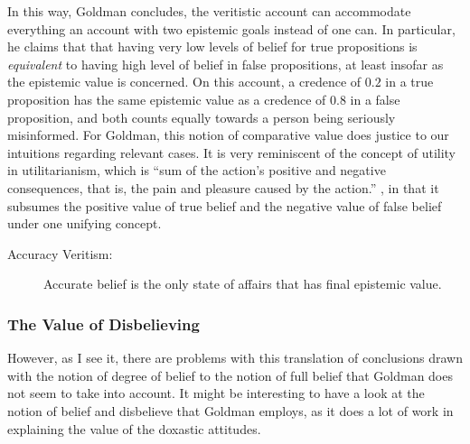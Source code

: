 \documentclass[12pt,numbers=noenddot]{scrartcl}
\begin{document}
In this way, Goldman concludes, the veritistic account can accommodate everything an account with two epistemic goals instead of one can. In particular, he claims that that having very low levels of belief for true propositions is \emph{equivalent} to having high level of belief in false propositions, at least insofar as the epistemic value is concerned. On this account, a credence of $0.2$ in a true proposition has the same epistemic value as a credence of $0.8$ in a false proposition, and both counts equally towards a person being seriously misinformed. For Goldman, this notion of comparative value does justice to our intuitions regarding relevant cases. It is very reminiscent of the concept of utility in utilitarianism, which is “sum of the action's positive and negative consequences, that is, the pain and pleasure caused by the action.” \autocite{depaul_value_2001}, in that it subsumes the positive value of true belief and the negative value of false belief under one unifying concept.

\begin{description}
    \item[Accuracy Veritism:] Accurate belief is the only state of affairs that has final epistemic value.
\end{description}

\subsubsection{The Value of Disbelieving}

However, as I see it, there are problems with this translation of conclusions drawn with the notion of degree of belief to the notion of full belief that Goldman does not seem to take into account. It might be interesting to have a look at the notion of belief and disbelieve that Goldman employs, as it does a lot of work in explaining the value of the doxastic attitudes.
\end{document}
